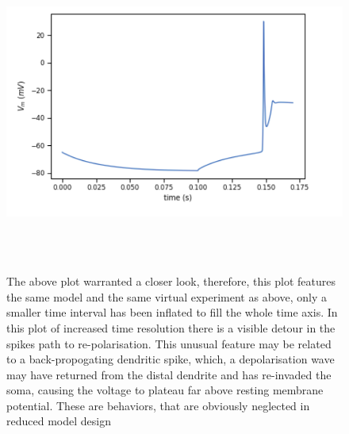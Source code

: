 \centering
\begin{figure}
  \centering
    \includegraphics[scale=0.8]{figures/spike_shape.png}
    \caption[Complex spike in the L5PC model]{The above plot warranted a closer look, therefore, this plot features the same model and the same virtual experiment as above, only a smaller time interval has been inflated to fill the whole time axis. In this plot of increased time resolution there is a visible detour in the spikes path to re-polarisation. This unusual feature may be related to a back-propogating dendritic spike, which, a depolarisation wave may have returned from the distal dendrite and has re-invaded the soma, causing the voltage to plateau far above resting membrane potential. These are behaviors, that are obviously neglected in reduced model design}
  \label{fig:sub1}
\end{figure}

